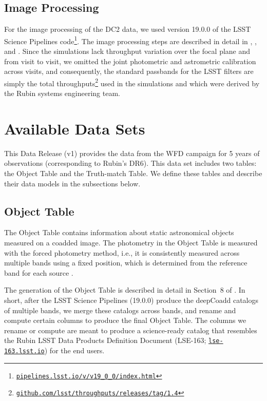 \documentclass[modern]{descnote}
\newcommand*{\https}[1]{\href{https://#1}{\nolinkurl{#1}}}
\begin{document}
\subsection{Image Processing}
For the image processing of the DC2 data, we used version 19.0.0 of the LSST Science Pipelines code\footnote{\https{pipelines.lsst.io/v/v19_0_0/index.html}}.  The image processing steps are described in detail in \cite{2020arXiv201005926L}, \cite{10.1093/pasj/psx080}, and \cite{2018arXiv181203248B}.   Since the simulations lack throughput variation over the focal plane and from visit to visit, we omitted the joint photometric and astrometric calibration across visits, and consequently, the standard passbands for the LSST filters are simply the total throughputs\footnote{\https{github.com/lsst/throughputs/releases/tag/1.4}} used in the simulations and which were derived by the Rubin systems engineering team.


\section{Available Data Sets}
\label{sec:products}

This Data Release (v1) provides the data from the WFD campaign for 5 years of observations (corresponding to Rubin's DR6). This data set includes two tables: the Object Table and the Truth-match Table. We define these tables and describe their data models in the subsections below. 

\subsection{Object Table}
\label{sec:object}

The Object Table contains information about static astronomical objects measured on a coadded image. The photometry in the Object Table is measured with the forced photometry method, i.e., it is consistently measured across multiple bands using a fixed position, which is determined from the reference band for each source \citep[Section~3.4 of][]{10.1093/pasj/psx080}. 

The generation of the Object Table is described in detail in Section~8 of \cite{2020arXiv201005926L}. In short, after the LSST Science Pipelines (19.0.0) produce the deepCoadd catalogs of multiple bands, we merge these catalogs across bands, and rename and compute certain columns to produce the final Object Table. The columns we rename or compute are meant to produce a science-ready catalog that resembles the Rubin LSST Data Products Definition Document (LSE-163; \https{lse-163.lsst.io}) for the end users. 
\end{document}
